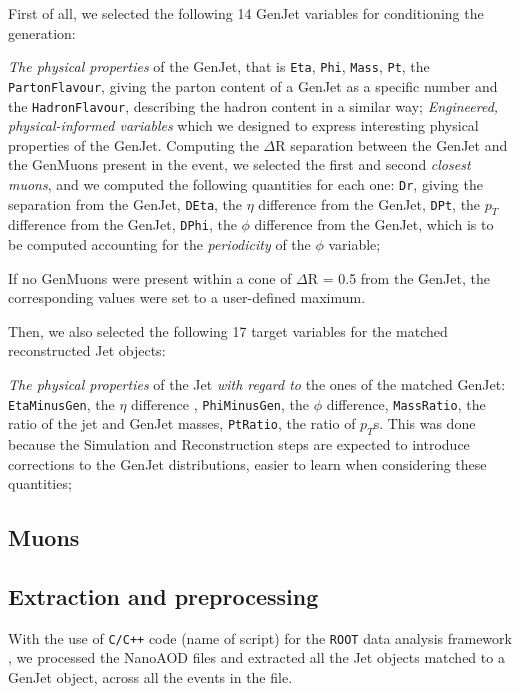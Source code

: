 First of all, we selected the following 14 GenJet variables for conditioning the generation: 

\begin{outline}
\1 \emph{The physical properties} of the GenJet, that is \texttt{Eta}, \texttt{Phi}, \texttt{Mass}, \texttt{Pt}, the \texttt{PartonFlavour}, giving the parton content of a GenJet as a specific number and the \texttt{HadronFlavour}, describing the hadron content in a similar way;
\1 \emph{Engineered, physical-informed variables} which we designed to express interesting physical properties of the GenJet. Computing the $\Delta$R separation between the GenJet and the GenMuons present in the event, we selected the first and second \emph{closest muons}, and we computed the following quantities for each one:
\2 \texttt{Dr}, giving the separation from the GenJet, \texttt{DEta}, the $\eta$ difference from the GenJet, \texttt{DPt}, the $p_T$ difference from the GenJet, \texttt{DPhi}, the $\phi$ difference from the GenJet, which is to be computed accounting for the \emph{periodicity} of the $\phi$ variable;

\1 If no GenMuons were present within a cone of $\Delta$R = 0.5 from the GenJet, the corresponding values were set to a user-defined maximum.

\end{outline}

Then, we also selected the following 17 target variables for the matched reconstructed Jet objects:

\begin{outline}
\1 \emph{The physical properties} of the Jet \emph{with regard to} the ones of the matched GenJet: \texttt{EtaMinusGen}, the $\eta$ difference , \texttt{PhiMinusGen}, the $\phi$ difference, \texttt{MassRatio}, the ratio of the jet and GenJet masses, \texttt{PtRatio}, the ratio of $p_T$s. This was done because the Simulation and Reconstruction steps are expected to introduce corrections to the GenJet distributions, easier to learn when considering these quantities;
\end{outline}
\subsection{Muons}

\subsection{Extraction and preprocessing}
With the use of \texttt{C/C++} code (name of script) for the \texttt{ROOT} data analysis framework \cite{Brun:491486}, we processed the NanoAOD files and extracted all the Jet objects matched to a GenJet object, across all the events in the file.
